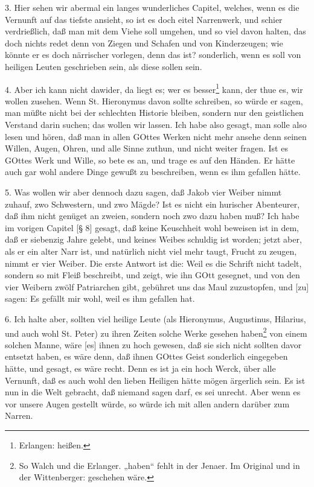 3. Hier sehen wir abermal ein langes wunderliches Capitel, welches, wenn es die Vernunft auf das tiefste ansieht, so ist es doch eitel Narrenwerk, und schier verdrießlich, daß man mit dem Viehe soll umgehen, und so viel davon halten, das doch nichts redet denn von Ziegen und Schafen und von Kinderzeugen; wie könnte er es doch närrischer vorlegen, denn das ist? sonderlich, wenn es soll von heiligen Leuten geschrieben sein, als diese sollen sein.

4. Aber ich kann nicht dawider, da liegt es; wer es besser\footnote{Erlangen: heißen.} kann, der thue es, wir wollen zusehen. Wenn St. Hieronymus davon sollte schreiben, so würde er sagen, man müßte nicht bei der schlechten Historie bleiben, sondern nur den geistlichen Verstand darin suchen; das wollen wir lassen. Ich habe also gesagt, man solle also lesen und hören, daß man in allen GOttes Werken nicht mehr ansehe denn seinen Willen, Augen, Ohren, und alle Sinne zuthun, und nicht weiter fragen. Ist es GOttes Werk und Wille, so bete es an, und trage es auf den Händen. Er hätte auch gar wohl andere Dinge gewußt zu beschreiben, wenn es ihm gefallen hätte.

5. Was wollen wir aber dennoch dazu sagen, daß Jakob vier Weiber nimmt zuhauf, zwo Schwestern, und zwo Mägde? Ist es nicht ein hurischer Abenteurer, daß ihm nicht genüget an zweien, sondern noch zwo dazu haben muß? Ich habe im vorigen Capitel [§ 8] gesagt, daß keine Keuschheit wohl beweisen ist in dem, daß er siebenzig Jahre gelebt, und keines Weibes schuldig
ist worden; jetzt aber, als er ein alter Narr ist, und natürlich nicht viel mehr taugt, Frucht zu zeugen, nimmt er vier Weiber. Die erste Antwort ist die: Weil es die Schrift nicht tadelt, sondern so mit Fleiß beschreibt, und zeigt, wie ihn GOtt gesegnet, und von den vier Weibern zwölf Patriarchen gibt, gebühret uns das Maul zuzustopfen, und [zu] sagen: Es gefällt mir wohl, weil es ihm gefallen hat.

6. Ich halte aber, sollten viel heilige Leute (als Hieronymus, Augustinus, Hilarius, und auch wohl St. Peter) zu ihren Zeiten solche Werke gesehen haben\footnote{So Walch und die Erlanger. „haben“ fehlt in der Jenaer. Im Original und in der Wittenberger: geschehen wäre.} von einem solchen Manne, wäre [es] ihnen zu hoch gewesen, daß sie sich nicht sollten davor entsetzt haben, es wäre denn, daß ihnen GOttes Geist sonderlich eingegeben hätte, und gesagt, es wäre recht. Denn es ist ja ein hoch Werck, über alle Vernunft, daß es auch wohl den lieben Heiligen hätte mögen ärgerlich sein. Es ist nun in die Welt gebracht, daß niemand sagen darf, es sei unrecht. Aber wenn es vor unsere Augen gestellt würde, so würde ich mit allen andern darüber zum Narren.

